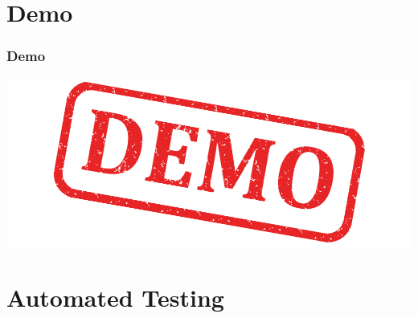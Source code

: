 \section{Demo}

\begin{frame}
  \frametitle{Demo}
  \includegraphics[width=\textwidth]{images/demo}
\end{frame}

\section{Automated Testing}

